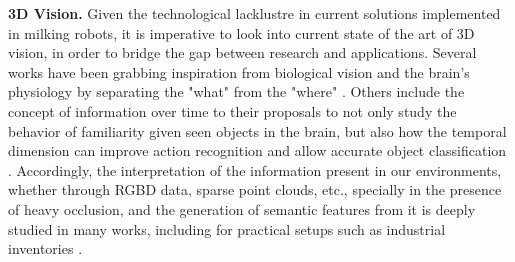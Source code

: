 \textbf{3D Vision.}
Given the technological lacklustre in current solutions implemented in milking robots, it is imperative to look into current state of the art of 3D vision, in order to bridge the gap between research and applications. 
%
Several works have been grabbing inspiration from biological vision and the brain's physiology by separating the "what" from the "where" \cite{medathati2016bio, ebrahimpour2019ventral}. Others include the concept of information over time to their proposals to not only study the behavior of familiarity given seen objects in the brain, but also how the temporal dimension can improve action recognition and allow accurate object classification \cite{wagatsuma2018locus, simonyan2014two, diba2017temporal, hou2019efficient}. Accordingly, the interpretation of the information present in our environments, whether through RGBD data, sparse point clouds, etc., specially in the presence of heavy occlusion, and the generation of semantic features from it is deeply studied in many works, including for practical setups such as industrial inventories \cite{qi2018frustum, qi2017pointnet, qi2017pointnet++, nivaggioli2019using}.
% 

